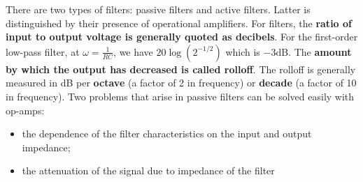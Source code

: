 \documentclass[a4paper]{article}
\begin{document}
\begin{Note}[Filters]
There are two types of filters: passive filters and active filters. Latter is distinguished by their presence of operational amplifiers. For filters, the \textbf{ratio of input to output voltage is generally quoted as decibels}. For the first-order low-pass filter, at $\omega=\frac{1}{RC}$, we have $20\log(2^{-1/2})$ which is $-3$dB. The \textbf{amount by which the output has decreased is called rolloff}. The rolloff is generally measured in dB per \textbf{octave} (a factor of 2 in frequency) or \textbf{decade} (a factor of 10 in frequency). Two problems that arise in passive filters can be solved easily with op-amps:~\cite{ahmed_spreadbury_1984,10.5555/2960712}
\begin{itemize}
    \item the dependence of the filter characteristics on the input and output impedance;
    \item the attenuation of the signal due to impedance of the filter
\end{itemize}
\end{Note}
\newpage
\end{document}
